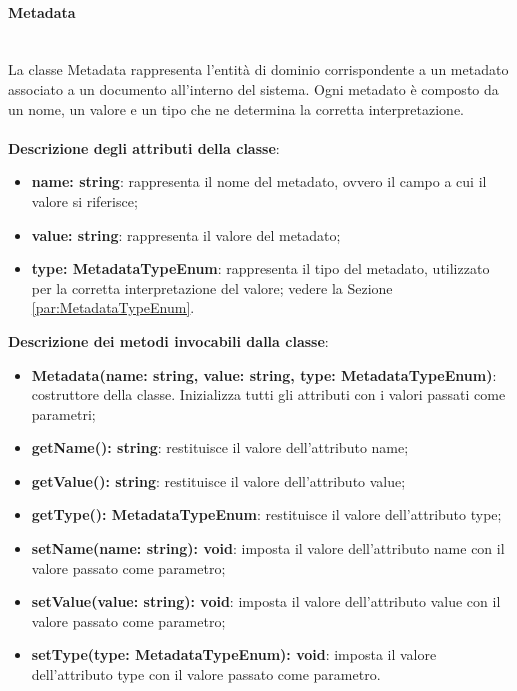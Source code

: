 \documentclass[a4paper,12pt]{article}
\begin{document}
{{{                \paragraph{Metadata}\label{par:Metadata}\mbox{}\\
                La classe Metadata rappresenta l'entità di dominio corrispondente a un metadato associato a un documento all'interno del sistema. Ogni metadato è composto da un nome, un valore e un tipo che ne determina la corretta interpretazione.\\
                \\
                \textbf{Descrizione degli attributi della classe}:
                \begin{itemize}
                    \item \textbf{name: string}: rappresenta il nome del metadato, ovvero il campo a cui il valore si riferisce;
                    \item \textbf{value: string}: rappresenta il valore del metadato;
                    \item \textbf{type: MetadataTypeEnum}: rappresenta il tipo del metadato, utilizzato per la corretta interpretazione del valore; vedere la Sezione \ref{par:MetadataTypeEnum}.
                \end{itemize}
 
              \noindent \textbf{Descrizione dei metodi invocabili dalla classe}:
                \begin{itemize}
                    \item \textbf{Metadata(name: string, value: string, type: MetadataTypeEnum)}: costruttore della classe. Inizializza tutti gli attributi con i valori passati come parametri;
                    \item \textbf{getName(): string}: restituisce il valore dell'attributo name;
                    \item \textbf{getValue(): string}: restituisce il valore dell'attributo value;
                    \item \textbf{getType(): MetadataTypeEnum}: restituisce il valore dell'attributo type;
                    \item \textbf{setName(name: string): void}: imposta il valore dell'attributo name con il valore passato come parametro;
                    \item \textbf{setValue(value: string): void}: imposta il valore dell'attributo value con il valore passato come parametro;
                    \item \textbf{setType(type: MetadataTypeEnum): void}: imposta il valore dell'attributo type con il valore passato come parametro.
                \end{itemize}
}}}
\end{document}
